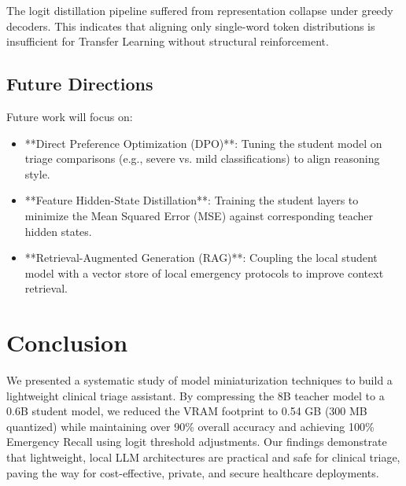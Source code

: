 \documentclass[a4paper, 12pt]{article}
\begin{document}
The logit distillation pipeline suffered from representation collapse under greedy decoders. This indicates that aligning only single-word token distributions is insufficient for Transfer Learning without structural reinforcement.

\subsection{Future Directions}
Future work will focus on:
\begin{itemize}
    \item **Direct Preference Optimization (DPO)**: Tuning the student model on triage comparisons (e.g., severe vs. mild classifications) to align reasoning style.
    \item **Feature Hidden-State Distillation**: Training the student layers to minimize the Mean Squared Error (MSE) against corresponding teacher hidden states.
    \item **Retrieval-Augmented Generation (RAG)**: Coupling the local student model with a vector store of local emergency protocols to improve context retrieval.
\end{itemize}

\section{Conclusion}
\label{sec:conclusion}
We presented a systematic study of model miniaturization techniques to build a lightweight clinical triage assistant. By compressing the 8B teacher model to a 0.6B student model, we reduced the VRAM footprint to 0.54 GB (300 MB quantized) while maintaining over 90\% overall accuracy and achieving 100\% Emergency Recall using logit threshold adjustments. Our findings demonstrate that lightweight, local LLM architectures are practical and safe for clinical triage, paving the way for cost-effective, private, and secure healthcare deployments.


 
\end{document}

